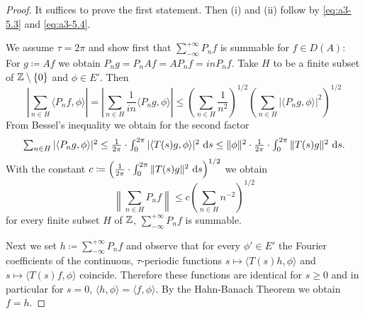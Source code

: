 \begin{proof}
It suffices to prove the first statement. Then (i) and (ii) follow by \eqref{eq:a3-5.3} and \eqref{eq:a3-5.4}.

We assume $\tau = 2\pi$ and show first that $\sum_{-\infty}^{+\infty} P_{n}f$ is summable for $f \in D(A)$: For $g \coloneqq Af$ we obtain $P_{n}g = P_{n}Af = AP_{n}f = inP_{n}f$.
Take $H$ to be a finite subset of $\mathbb{Z} \setminus \{0\}$ and $\phi \in E'$. Then
\[\textstyle
\left|\sum_{n \in H} \langle P_{n}f,\phi \rangle\right|
= \left|\sum_{n \in H} \frac{1}{in} \langle P_{n}g,\phi \rangle\right| 
\leq \left(\sum_{n \in H} \frac{1}{n^2}\right)^{1/2}\left(\sum_{n \in H} |\langle P_{n}g,\phi \rangle|^{2}\right)^{1/2}
\]
From Bessel's inequality we obtain for the second factor
\[\textstyle
\sum_{n \in H} |\langle P_{n}g,\phi \rangle|^{2} \leq \frac{1}{2\pi} \cdot \int_{0}^{2\pi} |\langle T(s)g,\phi \rangle|^{2} \, \mathop{}\!\mathrm{d}{s} 
\leq \|\phi\|^{2} \cdot \frac{1}{2\pi} \cdot \int_{0}^{2\pi} \|T(s)g\|^{2} \, \mathop{}\!\mathrm{d}{s}  .
\]
With the constant $c \coloneqq \left(\frac{1}{2\pi} \cdot \int_{0}^{2\pi} \|T(s)g\|^{2} \, \mathop{}\!\mathrm{d}{s}\right)^{1/2}$ we obtain
\[\textstyle
\left\|\sum_{n \in H} P_{n}f\right\| \leq c\left(\sum_{n \in H} n^{-2}\right)^{1/2}
\]
for every finite subset $H$ of $\mathbb{Z}$, \ie $\sum_{-\infty}^{+\infty} P_{n}f$ is summable.

Next we set $h \coloneqq \sum_{-\infty}^{+\infty} P_{n}f$ and observe that for every $\phi' \in E'$ the Fourier coefficients of the continuous, $\tau$-periodic functions
$s \mapsto \langle T(s)h,\phi \rangle$ and $s \mapsto \langle T(s)f,\phi \rangle$
coincide.
Therefore these functions are identical for $s \geq 0$ and in particular for $s = 0$, \ie $\langle h,\phi \rangle = \langle f,\phi \rangle$.
By the Hahn-Banach Theorem we obtain $f = h$.
\end{proof}

